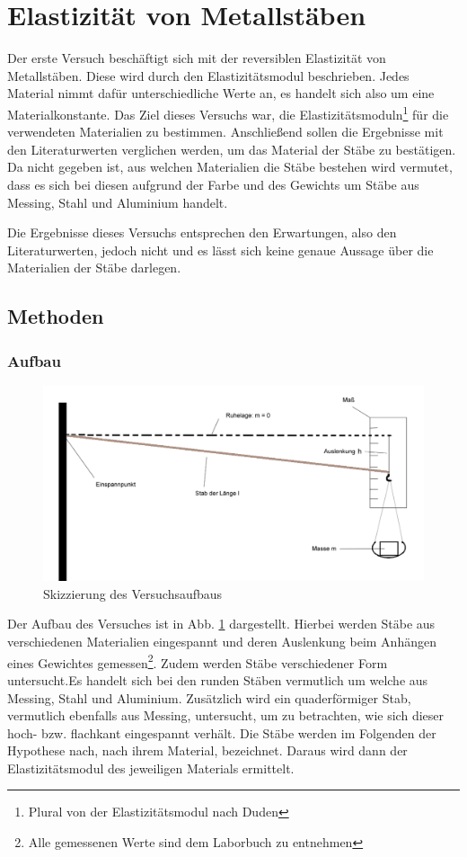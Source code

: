 
	\section{Elastizität von Metallstäben}
	
	Der erste Versuch beschäftigt sich mit der reversiblen Elastizität von Metallstäben. Diese wird durch den Elastizitätsmodul beschrieben. Jedes Material nimmt dafür unterschiedliche Werte an, es handelt sich also um eine Materialkonstante.
	Das Ziel dieses Versuchs war, die Elastizitätsmoduln\footnote{Plural von \glqq der Elastizitätsmodul\grqq {} nach Duden} für die verwendeten Materialien zu bestimmen.
	Anschließend sollen die Ergebnisse mit den Literaturwerten verglichen werden, um das Material der Stäbe zu bestätigen.
	Da nicht gegeben ist, aus welchen Materialien die Stäbe bestehen wird vermutet, dass es sich bei diesen aufgrund der Farbe und des Gewichts um Stäbe aus Messing, Stahl und Aluminium handelt.
	
	Die Ergebnisse dieses Versuchs entsprechen den Erwartungen, also den Literaturwerten, jedoch nicht und es lässt sich keine genaue Aussage über die Materialien der Stäbe darlegen.
	
	\subsection{Methoden}	
	
	\subsubsection*{Aufbau}
	
	\begin{figure}[ht]
		\centering
		\includegraphics[width=\textwidth]{StabAuslenkungSkizze.png}
		\caption{Skizzierung des Versuchsaufbaus}
		\label{abb:Versuchsskizze1}	
	\end{figure}	
	Der Aufbau des Versuches ist in Abb. \ref{abb:Versuchsskizze1} dargestellt. Hierbei werden Stäbe aus verschiedenen Materialien eingespannt und deren Auslenkung beim Anhängen eines Gewichtes gemessen\footnote{Alle gemessenen Werte sind dem Laborbuch zu entnehmen}.
	Zudem werden Stäbe verschiedener Form untersucht.Es handelt sich bei den runden Stäben vermutlich um welche aus Messing, Stahl und Aluminium. Zusätzlich wird ein quaderförmiger Stab, vermutlich ebenfalls aus Messing, untersucht, um zu betrachten, wie sich dieser hoch- bzw. flachkant eingespannt verhält. Die Stäbe werden im Folgenden der Hypothese nach, nach ihrem Material, bezeichnet.
	Daraus wird dann der Elastizitätsmodul des jeweiligen Materials ermittelt.
	
